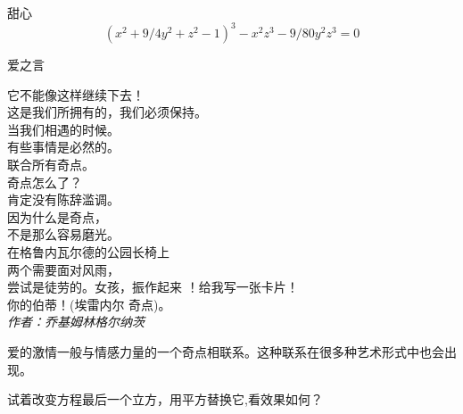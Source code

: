 ﻿\begin{surferPage}{甜心}
\[(x^2+ 9/4y^2	+ z^2- 1)^3- x^2z^3	- 9/80y^2z^3	= 0\]

\singlespacing
 爱之言
\singlespacing

它不能像这样继续下去！\\
这是我们所拥有的，我们必须保持。\\
当我们相遇的时候。\\
有些事情是必然的。\\
联合所有奇点。\\
奇点怎么了？\\
肯定没有陈辞滥调。\\
因为什么是奇点，\\
不是那么容易磨光。\\
在格鲁内瓦尔德的公园长椅上\\
两个需要面对风雨，\\
尝试是徒劳的。女孩，振作起来 ！给我写一张卡片！\\
你的伯蒂！(埃雷内尔 奇点)。\\
\textit{作者：乔基姆林格尔纳茨}

\singlespacing 
爱的激情一般与情感力量的一个奇点相联系。这种联系在很多种艺术形式中也会出现。

\singlespacing 
试着改变方程最后一个立方，用平方替换它,看效果如何？
\end{surferPage}
